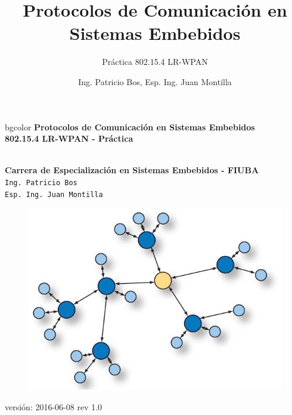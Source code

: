 \documentclass[aspectratio=169,handout]{beamer}
\title[802.15.4 LR-WPAN]{Protocolos de Comunicación en Sistemas Embebidos}
\subtitle{Práctica 802.15.4 LR-WPAN}
\author[]{Ing. Patricio Bos, Esp. Ing. Juan Montilla}
\institute[CESE-FIUBA]{Carrera de Especialización en Sistemas Embebidos - FIUBA}
\date{}
\begin{document}

%



\begingroup
\makeatletter
\setlength{\hoffset}{-.5\beamer@sidebarwidth}
\makeatother
\begin{frame}
\begin{center}
\hfill
    \begin{beamercolorbox}[center,dp=3ex,ht=10.25ex, wd=1\linewidth]{bgcolor}
        \Large\textbf{Protocolos de Comunicación en Sistemas Embebidos}\\
        \huge\textbf{802.15.4 LR-WPAN - Práctica}
    \end{beamercolorbox}
\hfill\hfill
\\
\vspace{5px}
\textbf{Carrera de Especialización en Sistemas Embebidos - FIUBA}\\
\vspace{10px}
\texttt{Ing. Patricio Bos}\\
\texttt{Esp. Ing. Juan Montilla}\\

\vspace{10px}

\begin{figure}[H]
	\includegraphics[width=.3\textwidth]{./imagenes/red.jpg}
\end{figure}	  	  	
\vspace{5px}
\tiny versión: 2016-06-08 rev 1.0 

\end{center}
\end{frame}
\endgroup
\end{document}
